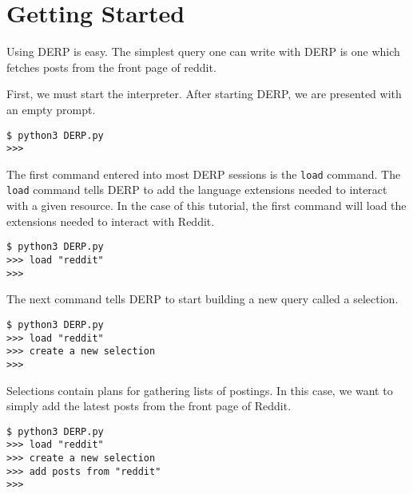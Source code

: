 \section{Getting Started}
Using DERP is easy. The simplest query one can write with DERP is one which fetches posts from the front page of reddit.

First, we must start the interpreter. After starting DERP, we are presented with an empty prompt.
\newline\begin{minipage}{\linewidth}\begin{lstlisting}
$ python3 DERP.py
>>>
\end{lstlisting}\end{minipage}



The first command entered into most DERP sessions is the \texttt{load} command. The \texttt{load} command tells DERP to add the language
extensions needed to interact with a given resource. In the case of this tutorial, the first command will load the
extensions needed to interact with Reddit.
\newline\begin{minipage}{\linewidth}\begin{lstlisting}
$ python3 DERP.py
>>> load "reddit"
>>>
\end{lstlisting}\end{minipage}



The next command tells DERP to start building a new query called a selection.
\newline\begin{minipage}{\linewidth}\begin{lstlisting}
$ python3 DERP.py
>>> load "reddit"
>>> create a new selection
>>>
\end{lstlisting}\end{minipage}



Selections contain plans for gathering lists of postings. In this case, we want to simply add the latest posts from the front page of Reddit.
\newline\begin{minipage}{\linewidth}\begin{lstlisting}
$ python3 DERP.py
>>> load "reddit"
>>> create a new selection
>>> add posts from "reddit"
>>>
\end{lstlisting}\end{minipage}



